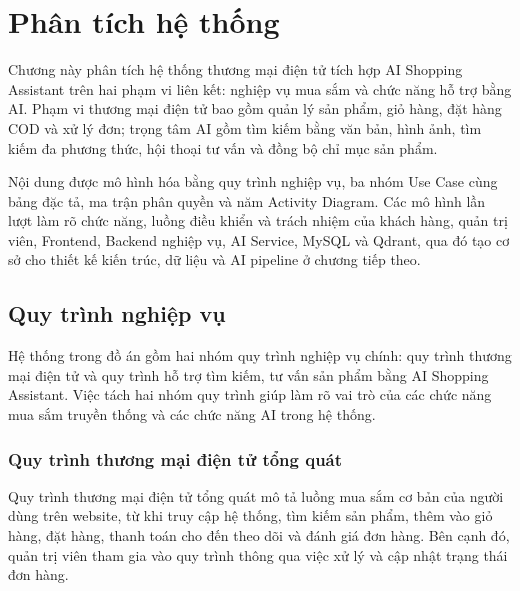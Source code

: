 \section{Phân tích hệ thống}

Chương này phân tích hệ thống thương mại điện tử tích hợp AI Shopping Assistant trên hai phạm vi liên kết: nghiệp vụ mua sắm và chức năng hỗ trợ bằng AI. Phạm vi thương mại điện tử bao gồm quản lý sản phẩm, giỏ hàng, đặt hàng COD và xử lý đơn; trọng tâm AI gồm tìm kiếm bằng văn bản, hình ảnh, tìm kiếm đa phương thức, hội thoại tư vấn và đồng bộ chỉ mục sản phẩm.

Nội dung được mô hình hóa bằng quy trình nghiệp vụ, ba nhóm Use Case cùng bảng đặc tả, ma trận phân quyền và năm Activity Diagram. Các mô hình lần lượt làm rõ chức năng, luồng điều khiển và trách nhiệm của khách hàng, quản trị viên, Frontend, Backend nghiệp vụ, AI Service, MySQL và Qdrant, qua đó tạo cơ sở cho thiết kế kiến trúc, dữ liệu và AI pipeline ở chương tiếp theo.
\subsection{Quy trình nghiệp vụ}
Hệ thống trong đồ án gồm hai nhóm quy trình nghiệp vụ chính: quy trình thương mại điện tử và quy trình hỗ trợ tìm kiếm, tư vấn sản phẩm bằng AI Shopping Assistant. Việc tách hai nhóm quy trình giúp làm rõ vai trò của các chức năng mua sắm truyền thống và các chức năng AI trong hệ thống.
\subsubsection{Quy trình thương mại điện tử tổng quát}

Quy trình thương mại điện tử tổng quát mô tả luồng mua sắm cơ bản của người dùng trên website, từ khi truy cập hệ thống, tìm kiếm sản phẩm, thêm vào giỏ hàng, đặt hàng, thanh toán cho đến theo dõi và đánh giá đơn hàng. Bên cạnh đó, quản trị viên tham gia vào quy trình thông qua việc xử lý và cập nhật trạng thái đơn hàng.


